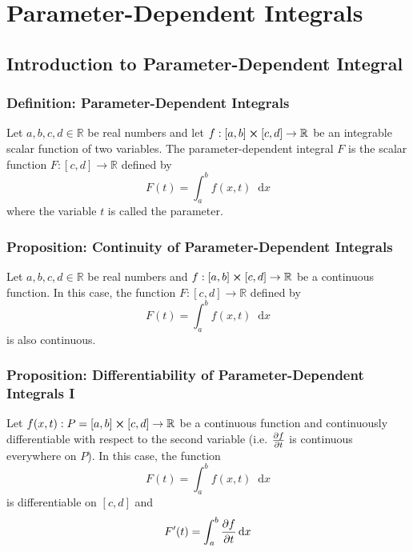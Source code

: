\documentclass[11pt, a4paper]{article}
\newcommand{\diff}{\mathop{}\!\mathrm{d}} %
\begin{document}
\section{Parameter-Dependent Integrals}

\subsection{Introduction to Parameter-Dependent Integral}

\subsubsection{Definition: Parameter-Dependent Integrals}
Let $ a, b, c, d \in \mathbb{R}$ be real numbers and let $ f : [a, b] \cross [c, d] \rightarrow \mathbb{R}$ be an integrable scalar function of two variables. The parameter-dependent integral $ F $ is the scalar function $ F : [c, d] \rightarrow \mathbb{R} $ defined by 
\begin{equation*}
F(t) = \int_{a}^{b}f(x, t) \diff x
\end{equation*}
where the variable $ t $ is called the parameter.



\subsubsection{Proposition: Continuity of Parameter-Dependent Integrals}
Let $ a, b, c, d \in \mathbb{R}$ be real numbers and $ f : [a, b] \cross [c, d] \rightarrow \mathbb{R}$ be a continuous function. In this case, the function $ F : [c, d] \rightarrow \mathbb{R} $ defined by 
\begin{equation*}
F(t) = \int_{a}^{b}f(x, t) \diff x
\end{equation*}
is also continuous.


\subsubsection{Proposition: Differentiability of Parameter-Dependent Integrals I}
Let $ f(x, t) : P = [a, b] \cross [c, d] \rightarrow \mathbb{R}$ be a continuous function and continuously differentiable with respect to the second variable (i.e. $ \pdv{f}{t} $ is continuous everywhere on $ P $). In this case, the function 
\begin{equation*}
F(t) = \int_{a}^{b}f(x, t) \diff x
\end{equation*}
is differentiable on $ [c, d] $ and
\begin{equation*}
F'(t) = \int_{a}^{b}\pdv{f}{t} (x, t) \diff x
\end{equation*}
\end{document}
